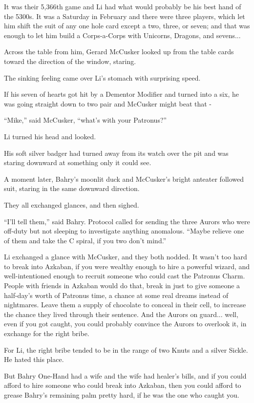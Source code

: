 It was their 5,366th game and Li had what would probably be his best hand of the 5300s. It was a Saturday in February and there were three players, which let him shift the suit of any one hole card except a two, three, or seven; and that was enough to let him build a Corps-a-Corps with Unicorns, Dragons, and sevens...

Across the table from him, Gerard McCusker looked up from the table cards toward the direction of the window, staring.

The sinking feeling came over Li's stomach with surprising speed.

If his seven of hearts got hit by a Dementor Modifier and turned into a six, he was going straight down to two pair and McCusker might beat that -

``Mike,'' said McCusker, ``what's with your Patronus?''

Li turned his head and looked.

His soft silver badger had turned away from its watch over the pit and was staring downward at something only it could see.

A moment later, Bahry's moonlit duck and McCusker's bright anteater followed suit, staring in the same downward direction.

They all exchanged glances, and then sighed.

``I'll tell them,'' said Bahry. Protocol called for sending the three Aurors who were off-duty but not sleeping to investigate anything anomalous. ``Maybe relieve one of them and take the C spiral, if you two don't mind.''

Li exchanged a glance with McCusker, and they both nodded. It wasn't too hard to break into Azkaban, if you were wealthy enough to hire a powerful wizard, and well-intentioned enough to recruit someone who could cast the Patronus Charm. People with friends in Azkaban would do that, break in just to give someone a half-day's worth of Patronus time, a chance at some real dreams instead of nightmares. Leave them a supply of chocolate to conceal in their cell, to increase the chance they lived through their sentence. And the Aurors on guard... well, even if you got caught, you could probably convince the Aurors to overlook it, in exchange for the right bribe.

For Li, the right bribe tended to be in the range of two Knuts and a silver Sickle. He hated this place.

But Bahry One-Hand had a wife and the wife had healer's bills, and if you could afford to hire someone who could break into Azkaban, then you could afford to grease Bahry's remaining palm pretty hard, if he was the one who caught you.

